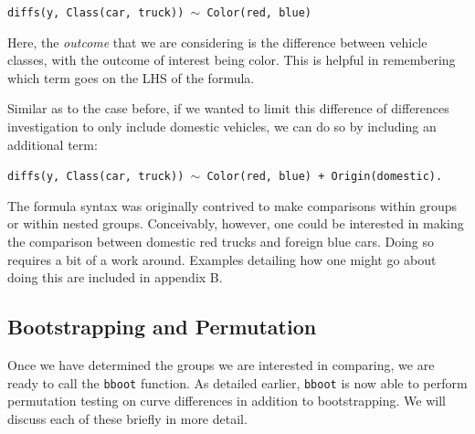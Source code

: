 \documentclass{article}
\newcommand{\xt}{\texttt}%
\begin{document}

\begin{center}
\tt diffs(y, Class(car, truck)) $\sim$ Color(red, blue)
\end{center}

Here, the \textit{outcome} that we are considering is the difference between vehicle classes, with the outcome of interest being color. This is helpful in remembering which term goes on the LHS of the formula. 

Similar as to the case before, if we wanted to limit this difference of differences investigation to only include domestic vehicles, we can do so by including an additional term:

\begin{center}
\tt diffs(y, Class(car, truck)) $\sim$ Color(red, blue) + Origin(domestic).
\end{center}

The formula syntax was originally contrived to make comparisons within groups or within nested groups. Conceivably, however, one could be interested in making the comparison between domestic red trucks and foreign blue cars. Doing so requires a bit of a work around. Examples detailing how one might go about doing this are included in appendix B. 


\subsection{Bootstrapping and Permutation}


Once we have determined the groups we are interested in comparing, we are ready to call the \xt{bboot} function. As detailed earlier, \xt{bboot} is now able to perform permutation testing on curve differences in addition to bootstrapping. We will discuss each of these briefly in more detail.
\end{document}
